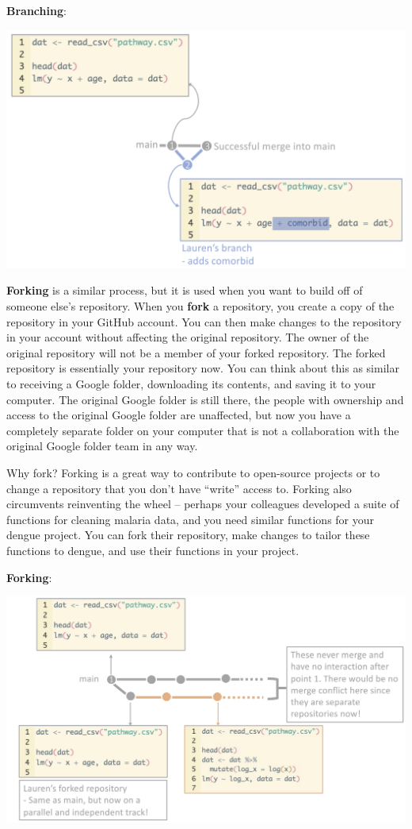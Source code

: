 \documentclass[
]{book}
\begin{document}
\textbf{Branching}:

\includegraphics[width=1\linewidth]{./figures/branching}

\textbf{Forking} is a similar process, but it is used when you want to build off of someone else's repository. When you \textbf{fork} a repository, you create a copy of the repository in your GitHub account. You can then make changes to the repository in your account without affecting the original repository. The owner of the original repository will not be a member of your forked repository. The forked repository is essentially your repository now. You can think about this as similar to receiving a Google folder, downloading its contents, and saving it to your computer. The original Google folder is still there, the people with ownership and access to the original Google folder are unaffected, but now you have a completely separate folder on your computer that is not a collaboration with the original Google folder team in any way.

Why fork? Forking is a great way to contribute to open-source projects or to change a repository that you don't have ``write'' access to. Forking also circumvents reinventing the wheel -- perhaps your colleagues developed a suite of functions for cleaning malaria data, and you need similar functions for your dengue project. You can fork their repository, make changes to tailor these functions to dengue, and use their functions in your project.

\textbf{Forking}:

\includegraphics[width=1\linewidth]{./figures/forking}
\end{document}
